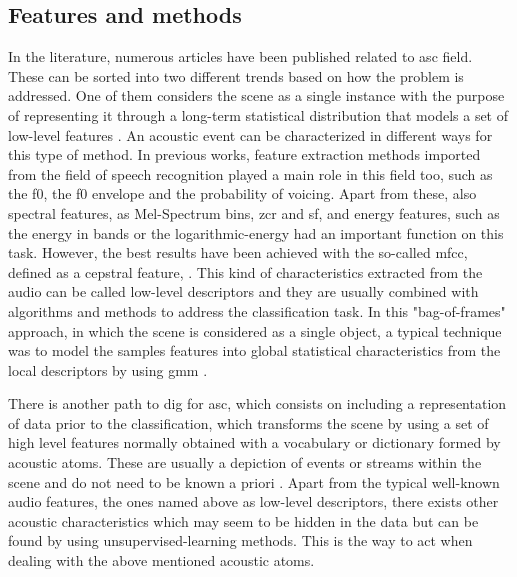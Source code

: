 	

\subsection{Features and methods}
\label{subsection:features-and-methods}
	
	In the literature, numerous articles have been published related to \acrshort{asc} field. These can be sorted into two different trends based on how the problem is addressed. One of them considers the scene as a single instance with the purpose of representing it through a long-term statistical distribution that models a set of low-level features \cite{Stowell2015}. An acoustic event can be characterized in different ways for this type of method. In previous works, feature extraction methods imported from the field of speech recognition played a main role in this field too, such as the \acrfull{f0}, the \acrshort{f0} envelope and the probability of voicing. Apart from these, also spectral features, as Mel-Spectrum bins, \acrfull{zcr} and \acrfull{sf}, and energy features, such as the energy in bands or the logarithmic-energy \cite{Geiger2013} had an important function on this task. However, the best results have been achieved with the so-called  \acrfull{mfcc}, defined as a cepstral feature, . This kind of characteristics extracted from the audio can be called low-level descriptors and they are usually combined with algorithms and methods to address the classification task. In this "bag-of-frames" approach, in which the scene is considered as a single object, a typical technique was to model the samples features into global statistical characteristics from the local descriptors by using \acrfull{gmm} \cite{Aucouturier2007}. 
	
	There is another path to dig for \acrlong{asc}, which consists on including a representation of data prior to the classification, which transforms the scene by using a set of high level features normally obtained with a vocabulary or dictionary formed by acoustic atoms. These are usually a depiction of events or streams within the scene and do not need to be known a priori \cite{Stowell2015}. Apart from the typical well-known audio features, the ones named above as low-level descriptors, there exists other acoustic characteristics which may seem to be hidden in the data but can be found by using unsupervised-learning methods. This is the way to act when dealing with the above mentioned acoustic atoms. 
	
